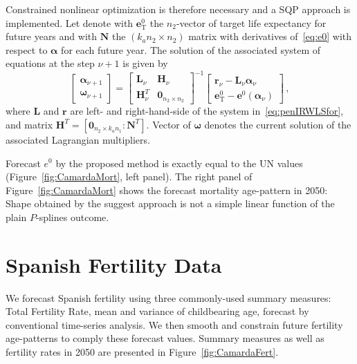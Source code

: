\documentclass[a4paper,twoside, openright, 12pt, leqno]{article}
\begin{document}
Constrained nonlinear optimization is therefore necessary and a SQP approach is implemented. Let denote with $\bm{e}^{0}_{\mathrm{T}}$ the $n_{2}$-vector of target life expectancy for future years and with $\bm{N}$ the $(k_{a}n_{2} \times n_{2})$ matrix with derivatives of~\eqref{eq:e0} with respect to $\bm{\alpha}$ for each future year. The solution of the associated system of equations at the step $\nu + 1$ is given by
\begin{equation}\label{eq:SQLalg}
\left[ \begin{array}{l}
\bm{\alpha}_{\nu+1}\\
\bm{\omega}_{\nu+1}
\end{array}\right] = 
\left[ \begin{array}{cl}
\bm{L}_{\nu}& \bm{H}_{\nu}\\
\bm{H}_{\nu}^{T} & \bm{0}_{n_{2} \times n_{2}}
\end{array}\right]^{-1}
\left[ \begin{array}{c}
\bm{r}_{\nu} - \bm{L}_{\nu}\bm{\alpha}_{\nu}\\
\bm{e}^{0}_{\mathrm{T}} - \bm{e}^{0} (\bm{\alpha}_{\nu})
\end{array}\right] \, ,
\end{equation}
where $\bm{L}$ and $\bm{r}$ are left- and right-hand-side of the system in~\eqref{eq:penIRWLSfor}, and matrix $\bm{H}^{T} = \left[\bm{0}_{n_{2}\times k_{a}n_{1}}:\bm{N}^{T}\right]$. Vector of $\bm{\omega}$ denotes the current solution of the associated Lagrangian multipliers.

Forecast $e^{0}$ by the proposed method is exactly equal to the UN values (Figure~\ref{fig:CamardaMort}, left panel). The right panel of Figure~\ref{fig:CamardaMort} shows the forecast mortality age-pattern in 2050: Shape obtained by the suggest approach is not a simple linear function of the plain $P$-splines outcome.

\section{Spanish Fertility Data}

We forecast Spanish fertility using three commonly-used summary measures: Total Fertility Rate, mean and variance of childbearing age, forecast by conventional time-series analysis. We then smooth and constrain future fertility age-patterns to comply these forecast values. Summary measures as well as fertility rates in 2050 are presented in Figure~\ref{fig:CamardaFert}. 
\end{document}
